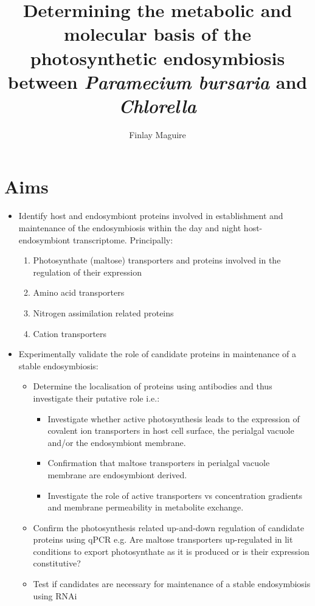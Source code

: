 \documentclass[a4paper,11pt]{article}
\title{Determining the metabolic and molecular basis of the photosynthetic endosymbiosis between \textit{Paramecium bursaria} and \textit{Chlorella}}
\author{Finlay Maguire}
\date{}
\begin{document}
\maketitle %
\tableofcontents

\section{Aims}

\begin{itemize}
  \item Identify host and endosymbiont proteins involved in establishment and maintenance of the endosymbiosis within the day and night host-endosymbiont transcriptome.  Principally:
  \begin{enumerate}
    \item Photosynthate (maltose) transporters and proteins involved in the regulation of their expression
    \item Amino acid transporters
    \item Nitrogen assimilation related proteins
    \item Cation transporters
  \end{enumerate}
  \item Experimentally validate the role of candidate proteins in maintenance of a stable endosymbiosis:
  \begin{itemize}
    \item Determine the localisation of proteins using antibodies and thus investigate their putative role  i.e.:
    \begin{itemize}
      \item Investigate whether active photosynthesis leads to the expression of covalent ion transporters in host cell surface, the perialgal vacuole and/or the endosymbiont membrane.
      \item Confirmation that maltose transporters in perialgal vacuole membrane are endosymbiont derived.
      \item Investigate the role of active transporters vs concentration gradients and membrane permeability in metabolite exchange.
    \end{itemize}
    \item Confirm the photosynthesis related up-and-down regulation of candidate proteins using qPCR e.g. Are maltose transporters up-regulated in lit conditions to export photosynthate as it is produced or is their expression constitutive?
    \item Test if candidates are necessary for maintenance of a stable endosymbiosis using RNAi

\end{itemize}
\end{itemize}
\end{document}
